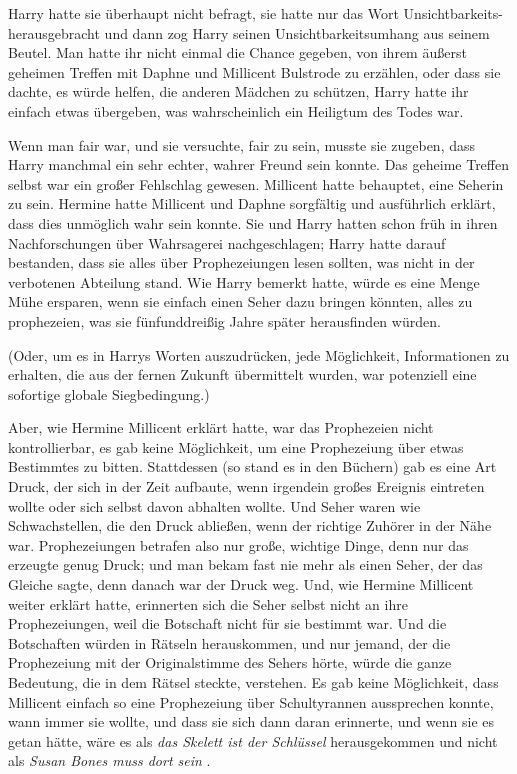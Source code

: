 Harry hatte sie überhaupt nicht befragt, sie hatte nur das Wort \glqq{}
Unsichtbarkeits-\grqq{} herausgebracht und dann zog Harry seinen
Unsichtbarkeitsumhang aus seinem Beutel. Man hatte ihr nicht einmal die Chance
gegeben, von ihrem äußerst geheimen Treffen mit Daphne und Millicent Bulstrode
zu erzählen, oder dass sie dachte, es würde helfen, die anderen Mädchen zu
schützen, Harry hatte ihr einfach etwas übergeben, was wahrscheinlich ein
Heiligtum des Todes war.

Wenn man fair war, und sie versuchte, fair zu sein, musste sie zugeben, dass
Harry manchmal ein sehr echter, wahrer Freund sein konnte. Das geheime Treffen
selbst war ein großer Fehlschlag gewesen. Millicent hatte behauptet, eine
Seherin zu sein. Hermine hatte Millicent und Daphne sorgfältig und ausführlich
erklärt, dass dies unmöglich wahr sein konnte. Sie und Harry hatten schon früh
in ihren Nachforschungen über Wahrsagerei nachgeschlagen; Harry hatte darauf
bestanden, dass sie alles über Prophezeiungen lesen sollten, was nicht in der
verbotenen Abteilung stand. Wie Harry bemerkt hatte, würde es eine Menge Mühe
ersparen, wenn sie einfach einen Seher dazu bringen könnten, alles zu
prophezeien, was sie fünfunddreißig Jahre später herausfinden würden.

(Oder, um es in Harrys Worten auszudrücken, jede Möglichkeit, Informationen zu
erhalten, die aus der fernen Zukunft übermittelt wurden, war potenziell eine
sofortige globale Siegbedingung.)

Aber, wie Hermine Millicent erklärt hatte, war das Prophezeien nicht
kontrollierbar, es gab keine Möglichkeit, um eine Prophezeiung über etwas
Bestimmtes zu bitten. Stattdessen (so stand es in den Büchern) gab es eine Art
Druck, der sich in der Zeit aufbaute, wenn irgendein großes Ereignis eintreten
wollte oder sich selbst davon abhalten wollte. Und Seher waren wie
Schwachstellen, die den Druck abließen, wenn der richtige Zuhörer in der Nähe
war. Prophezeiungen betrafen also nur große, wichtige Dinge, denn nur das
erzeugte genug Druck; und man bekam fast nie mehr als einen Seher, der das
Gleiche sagte, denn danach war der Druck weg. Und, wie Hermine Millicent weiter
erklärt hatte, erinnerten sich die Seher selbst nicht an ihre Prophezeiungen,
weil die Botschaft nicht für sie bestimmt war. Und die Botschaften würden in
Rätseln herauskommen, und nur jemand, der die Prophezeiung mit der
Originalstimme des Sehers hörte, würde die ganze Bedeutung, die in dem Rätsel
steckte, verstehen. Es gab keine Möglichkeit, dass Millicent einfach so eine
Prophezeiung über Schultyrannen aussprechen konnte, wann immer sie wollte, und
dass sie sich dann daran erinnerte, und wenn sie es getan hätte, wäre es als
\emph{\glqq{}das Skelett ist der Schlüssel\grqq{}} herausgekommen und nicht als
\emph{\glqq{}Susan Bones muss dort sein\grqq{}} .

